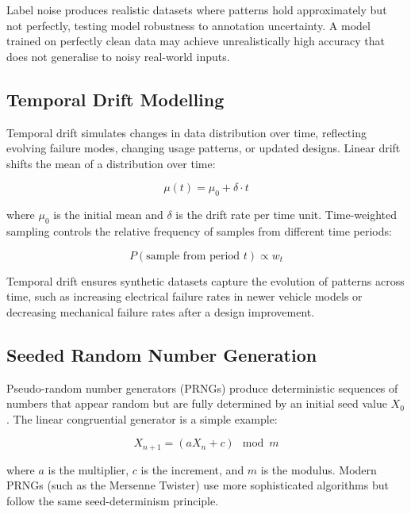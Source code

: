 \documentclass[10pt,a4paper]{article}
\begin{document}
Label noise produces realistic datasets where patterns hold approximately but not perfectly, testing model robustness to annotation uncertainty. A model trained on perfectly clean data may achieve unrealistically high accuracy that does not generalise to noisy real-world inputs.

\subsection{Temporal Drift Modelling}
\label{sec:temporal-drift}

Temporal drift simulates changes in data distribution over time, reflecting evolving failure modes, changing usage patterns, or updated designs. Linear drift shifts the mean of a distribution over time:

\begin{equation}
\mu(t) = \mu_0 + \delta \cdot t
\label{eq:linear-drift}
\end{equation}

where $\mu_0$ is the initial mean and $\delta$ is the drift rate per time unit. Time-weighted sampling controls the relative frequency of samples from different time periods:

\begin{equation}
P(\text{sample from period } t) \propto w_t
\label{eq:time-weights}
\end{equation}

Temporal drift ensures synthetic datasets capture the evolution of patterns across time, such as increasing electrical failure rates in newer vehicle models or decreasing mechanical failure rates after a design improvement.

\subsection{Seeded Random Number Generation}
\label{sec:seeded-rng}

Pseudo-random number generators (PRNGs) produce deterministic sequences of numbers that appear random but are fully determined by an initial seed value $X_0$. The linear congruential generator is a simple example:

\begin{equation}
X_{n+1} = (aX_n + c) \mod m
\label{eq:lcg}
\end{equation}

where $a$ is the multiplier, $c$ is the increment, and $m$ is the modulus. Modern PRNGs (such as the Mersenne Twister) use more sophisticated algorithms but follow the same seed-determinism principle.
\end{document}
